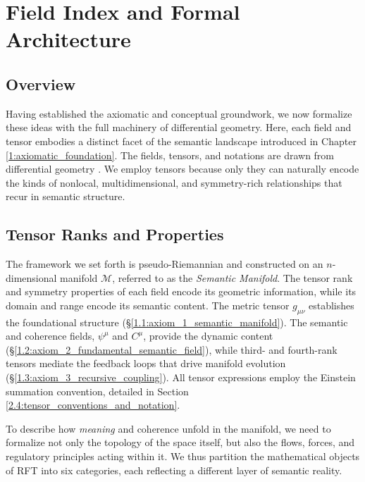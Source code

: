 \chapter{Field Index and Formal Architecture}
\label{2:field_index_and_formal_architecture}


\section{Overview}
\label{2.1:overview}

Having established the axiomatic and conceptual groundwork, we now formalize these ideas with the full machinery of differential geometry. Here, each field and tensor embodies a distinct facet of the semantic landscape introduced in Chapter \ref{1:axiomatic_foundation}. The fields, tensors, and notations are drawn from differential geometry \autocite{Riemann1868, Lee2012}. We employ tensors because only they can naturally encode the kinds of nonlocal, multidimensional, and symmetry-rich relationships that recur in semantic structure.


\section{Tensor Ranks and Properties}
\label{2.2:tensor_ranks_and_properties}

The framework we set forth is pseudo-Riemannian and constructed on an \(n\)-dimensional manifold \(\mathcal{M}\), referred to as the \textit{Semantic Manifold}. The tensor rank and symmetry properties of each field encode its geometric information, while its domain and range encode its semantic content. The metric tensor \(g_{\mu\nu}\) establishes the foundational structure (\S\ref{1.1:axiom_1_semantic_manifold}). The semantic and coherence fields, \(\psi^\mu\) and \(C^\mu\), provide the dynamic content (\S\ref{1.2:axiom_2_fundamental_semantic_field}), while third- and fourth-rank tensors mediate the feedback loops that drive manifold evolution (\S\ref{1.3:axiom_3_recursive_coupling}). All tensor expressions employ the Einstein summation convention, detailed in Section \ref{2.4:tensor_conventions_and_notation}.

To describe how \textit{meaning} and coherence unfold in the manifold, we need to formalize not only the topology of the space itself, but also the flows, forces, and regulatory principles acting within it. We thus partition the mathematical objects of RFT into six categories, each reflecting a different layer of semantic reality.

